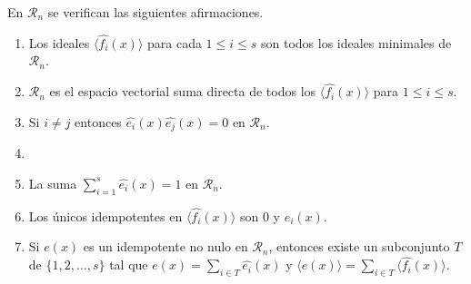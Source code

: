 \begin{theorem}
  \label{th:idempotentes-ideales-minimales}
  En \(\mathcal R_n\) se verifican las siguientes afirmaciones.
  \begin{enumerate}
    \item Los ideales \(\langle \widehat{f_i}(x)\rangle\) para cada \(1 \leq i \leq s\) son todos los ideales minimales de \(\mathcal R_n\).
    \item \(\mathcal R_n\) es el espacio vectorial suma directa de todos los \(\langle \widehat{f_i}(x)\rangle\) para \(1 \leq i \leq s\).
    \label{thi:idempotentes-ideales-minimales:suma-directa}
    \item Si \(i \neq j\) entonces \(\widehat{e_i}(x)\widehat{e_j}(x) = 0\) en \(\mathcal R_n\).
    \item \label{thi:idempotentes-ideales-minimales:cero}
    \item \label{thi:idempotentes-ideales-minimales:suma-idempotentes} La suma \(\sum_{i=1}^s \widehat{e_i}(x) = 1\) en \(\mathcal R_n\).
    \item \label{thi:idempotentes-ideales-minimales:unicos-idempotentes} Los únicos idempotentes en \(\langle \widehat{f_i}(x)\rangle\) son \(0\) y \(\widehat{e_i}(x)\).
    \item Si \(e(x)\) es un idempotente no nulo en \(\mathcal R_n\), entonces existe un subconjunto \(T\) de \(\{1, 2, \dots, s\}\) tal que \(e(x) = \sum_{i \in T}\widehat{e_i}(x)\) y \(\langle e(x) \rangle = \sum_{i \in T}\langle \widehat{f_i}(x)\rangle\).
  \end{enumerate}
\end{theorem}

